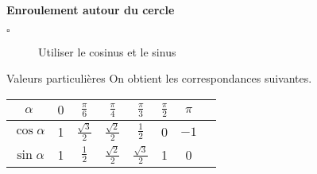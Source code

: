 \begin{titre}[Trigonométrie]

\end{titre}


\begin{CpsCol}
\textbf{Enroulement autour du cercle}
\begin{description}
\item[$\square$] Utiliser le cosinus et le sinus
\end{description}
\end{CpsCol}










\begin{DefT}{Valeurs particulières}
On obtient les correspondances suivantes.

\begin{tabular}{|c|c|c|c|c|c|c|c|}
\hline 
$\alpha$ & $0$ & $\frac{\pi}{6}$ & $\frac{\pi}{4}$ & $\frac{\pi}{3}$  & $\frac{\pi}{2}$& $\pi$ \\ 
\hline 
$\cos \alpha$ & 1 & $\frac{\sqrt{3}}{2}$ & $\frac{\sqrt{2}}{2}$ & $\frac{1}{2}$ & 0 & $-1$ \\ 
\hline 
$\sin \alpha$ & 1 & $\frac{1}{2}$ & $\frac{\sqrt{2}}{2}$ & $\frac{\sqrt{3}}{2}$ & 1 & 0  \\ 
\hline 
\end{tabular} 
\end{DefT}






